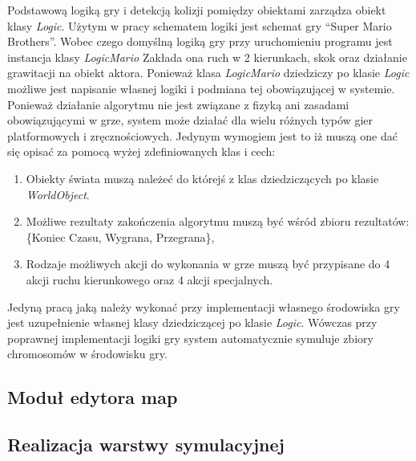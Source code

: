 \begin{par}
	Podstawową logiką gry i detekcją kolizji pomiędzy obiektami zarządza obiekt klasy \textit{Logic}. Użytym w pracy schematem logiki jest schemat gry ``Super Mario Brothers''. Wobec czego domyślną logiką gry przy uruchomieniu programu jest instancja klasy \textit{LogicMario}
	Zakłada ona ruch w 2 kierunkach, skok oraz działanie grawitacji na obiekt aktora.
	Ponieważ klasa \textit{LogicMario} dziedziczy po klasie \textit{Logic} możliwe jest napisanie własnej logiki i podmiana tej obowiązującej w systemie.
	Ponieważ działanie algorytmu nie jest związane z fizyką ani zasadami obowiązującymi w grze, system może działać dla wielu różnych typów gier platformowych i zręcznościowych.
	Jedynym wymogiem jest to iż muszą one dać się opisać za pomocą wyżej zdefiniowanych klas i cech:
	\begin{enumerate}
		\item
			Obiekty świata muszą należeć do którejś z klas dziedziczących po klasie \textit{WorldObject}.
		\item 
			Możliwe rezultaty zakończenia algorytmu muszą być wśród zbioru rezultatów: \{Koniec Czasu, Wygrana, Przegrana\}, 
		\item
			Rodzaje możliwych akcji do wykonania w grze muszą być przypisane do 4 akcji ruchu kierunkowego oraz 4 akcji specjalnych.
	\end{enumerate}

	Jedyną pracą jaką należy wykonać przy implementacji własnego środowiska gry jest uzupełnienie własnej klasy dziedziczącej po klasie \textit{Logic}.
	Wówczas przy poprawnej implementacji logiki gry system automatycznie symuluje zbiory chromosomów w środowisku gry.
\end{par}

\subsection{Moduł edytora map}
\begin{par}
\end{par}



\subsection{Realizacja warstwy symulacyjnej}

